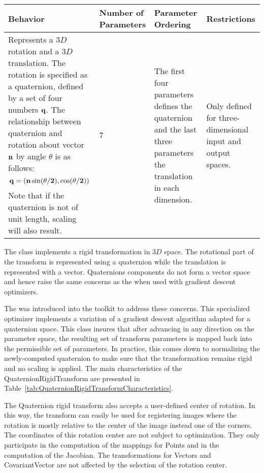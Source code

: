 \begin{table}
\begin{center}
\begin{tabular}{| p{4cm} | p{1.8cm} | p{2.5cm} | p{3cm} |}
\hline
\textbf{Behavior} &
\textbf{Number of Parameters} &
\textbf{Parameter Ordering} &
\textbf{Restrictions} \\
\hline\hline
Represents a $3D$ rotation and a $3D$ translation. The rotation is specified as a
quaternion, defined by a set of four numbers $\bf{q}$.  The relationship
between quaternion and rotation about vector $\bf{n}$ by angle $\theta$ is as
follows: \[ \bf{q} = (\bf{n}\sin(\theta/2), \cos(\theta/2))\] Note that if the
quaternion is not of unit length, scaling will also result. &
7 &
The first four parameters defines the quaternion and the last three parameters
the translation in each dimension. &
Only defined for three-dimensional input and output spaces. \\
\hline
\end{tabular}
\end{center}
\end{table}

The  class implements a rigid
transformation in $3D$ space. The rotational part of the transform is
represented using a quaternion while the translation is represented with a
vector. Quaternions components do not form a vector space and hence raise the
same concerns as the  when used with gradient
descent optimizers.

The  was introduced into the toolkit to address these concerns.  This specialized optimizer implements a variation of a
gradient descent algorithm adapted for a quaternion space.  This class
insures that after advancing in any direction on the parameter space, the
resulting set of transform parameters is mapped back into the permissible
set of parameters. In practice, this comes down to normalizing the newly-computed quaternion to make sure that the transformation remains rigid and no
scaling is applied.  The main characteristics of the
QuaternionRigidTransform are presented in
Table~\ref{tab:QuaternionRigidTransformCharacteristics}.

The Quaternion rigid transform also accepts a user-defined center of rotation.
In this way, the transform can easily be used for registering images where the
rotation is mostly relative to the center of the image instead one of the
corners. The coordinates of this rotation center are not subject to
optimization. They only participate in the computation of the mappings for
Points and in the computation of the Jacobian. The transformations for Vectors
and CovariantVector are not affected by the selection of the rotation center.



